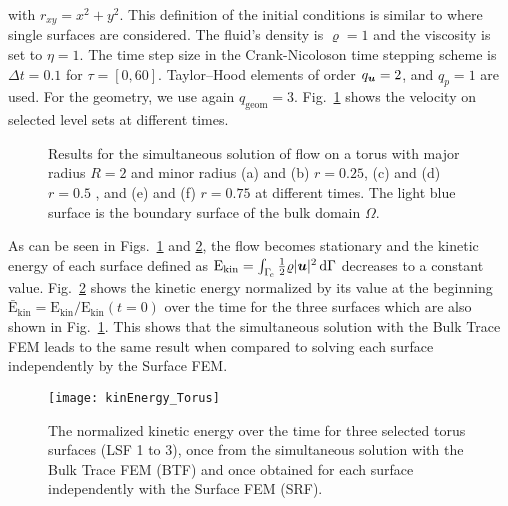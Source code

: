 \documentclass[12pt, twoside, english]{article}
\numberwithin{equation}{section}
\newcommand{\vek}[1]{\mathchoice{\displaystyle\boldsymbol#1}
{\textstyle\boldsymbol#1}{\scriptstyle\boldsymbol#1}
{\scriptscriptstyle\boldsymbol#1}}
\renewcommand{\d}{ \ensuremath{\mathrm{d} }}
\begin{document}
with $r_{xy} = x^2+y^2$. This definition of the initial conditions is similar to \cite{Yang_2020a} where single surfaces are considered. The fluid's density is $\varrho = 1$ and the viscosity is set to $\eta = 1$. The time step size in the Crank-Nicoloson time stepping scheme is $\Delta t = 0.1$ for $\tau = [0,60]$. Taylor--Hood elements of order $q_{\vek{u}} = 2$, and $q_{p} = 1$ are used. For the geometry, we use again $q_{\mathrm{geom}} = 3$. Fig.~\ref{fig:TorusRes} shows the velocity on selected level sets at different times.
\begin{figure}
	\centering
	
	\qquad
	\qquad
	\qquad
	\qquad
	\qquad
	\qquad
	
	\caption{\label{fig:TorusRes} Results for the simultaneous solution of flow on a torus with major radius $R=2$ and minor radius (a) and (b) $r = 0.25$, (c) and (d) $r = 0.5$ , and (e) and (f) $r = 0.75$ at different times. The light blue surface is the boundary surface of the bulk domain $\Omega$.}
\end{figure}
As can be seen in Figs.~\ref{fig:TorusRes} and \ref{fig:KinEngTorus}, the flow becomes stationary and the kinetic energy of each surface defined as $\mathrm{E}_{\mathrm{kin}} = \int_{\Gamma_{\!c}} \frac{1}{2} \varrho \lvert \vek{u} \rvert^2 \,\d\Gamma$ decreases to a constant value. Fig.~\ref{fig:KinEngTorus} shows the kinetic energy normalized by its value at the beginning $\bar{\mathrm{E}}_{\mathrm{kin}} = \mathrm{E}_{\mathrm{kin}} / \mathrm{E}_{\mathrm{kin}}(t=0)$ over the time for the three surfaces which are also shown in Fig.~\ref{fig:TorusRes}. This shows that the simultaneous solution with the Bulk Trace FEM leads to the same result when compared to solving each surface independently by the Surface FEM.
\begin{figure}
	\centering
	
	\texttt{[image: kinEnergy\_Torus]}
	
	\caption{\label{fig:KinEngTorus} The normalized kinetic energy over the time for three selected torus surfaces (LSF 1 to 3), once from the simultaneous solution with the Bulk Trace FEM (BTF) and once obtained for each surface independently with the Surface FEM (SRF).}
\end{figure}
\end{document}
